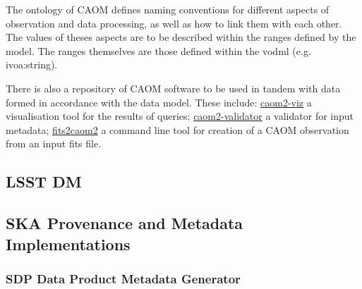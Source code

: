 The ontology of CAOM defines naming conventions for different aspects of observation and data processing, as well as how to link them with each other. The values of theses aspects are to be described within the ranges defined by the model. The ranges themselves are those defined within the vodml (e.g. ivoa:string). 

There is also a repository of CAOM software to be used in tandem with data formed in accordance with the data model. These include: \href{https://github.com/opencadc/caom2/tree/master/caom2-viz}{caom2-viz} a visualisation tool for the results of queries; \href{https://github.com/opencadc/caom2/tree/master/caom2-validator}{caom2-validator} a validator for input metadata; \href{https://github.com/opencadc/caom2/tree/master/fits2caom2}{fits2caom2} a command line tool for creation of a CAOM observation from an input fits file. 



\subsection{LSST DM}


\subsection{SKA Provenance and Metadata Implementations}

\subsubsection{SDP Data Product Metadata Generator}

